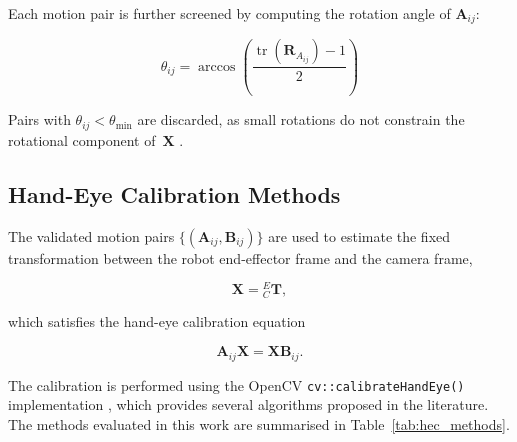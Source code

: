 Each motion pair is further screened by computing the rotation angle of
$\mathbf{A}_{ij}$:

\begin{equation}
    \theta_{ij} = \arccos\!\left(
        \frac{\operatorname{tr}(\mathbf{R}_{A_{ij}}) - 1}{2}
    \right)
    \label{eq:rot_angle}
\end{equation}

\noindent Pairs with $\theta_{ij} < \theta_{\min}$ are discarded, as small
rotations do not constrain the rotational component
of~$\mathbf{X}$ \cite{strobl2006optimal}.


\subsection{Hand-Eye Calibration Methods}
\label{subsec:calib_methods}

The validated motion pairs
$\{(\mathbf{A}_{ij}, \mathbf{B}_{ij})\}$ are used to estimate the
fixed transformation between the robot end-effector frame and the
camera frame,

\begin{equation}
	\mathbf{X} = {}^E_C\mathbf{T},
\end{equation}

which satisfies the hand-eye calibration equation

\begin{equation}
	\mathbf{A}_{ij}\mathbf{X}
	=
	\mathbf{X}\mathbf{B}_{ij}.
\end{equation}

The calibration is performed using the OpenCV
\texttt{cv::calibrateHandEye()} implementation
\cite{bradski2008learning}, which provides several algorithms proposed
in the literature. The methods evaluated in this work are summarised in
Table~\ref{tab:hec_methods}.


